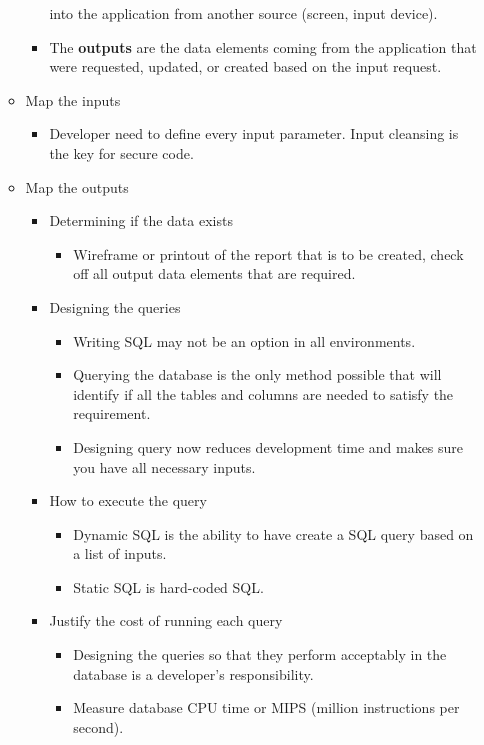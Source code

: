\documentclass[12pt]{article}
\begin{document}
\begin{itemize}
\begin{itemize}
\begin{itemize}
						into the application from another source (screen, input device).
					\item The \textbf{outputs} are the data elements coming from the
						application that were requested, updated, or created
						based on the input request.
				\end{itemize}
			\item Map the inputs
				\begin{itemize}
					\item Developer need to define every input parameter. Input
						cleansing is the key for secure code.
				\end{itemize}
			\item Map the outputs
				\begin{itemize}
					\item Determining if the data exists
						\begin{itemize}
							\item Wireframe or printout of the report that
								is to be created, check off all output
								data elements that are required.
						\end{itemize}
					\item Designing the queries
						\begin{itemize}
							\item Writing SQL may not be an option in all
								environments.
							\item Querying the database is the only method
								possible that will identify if all the
								tables and columns are needed to satisfy
								the requirement.
							\item Designing query now reduces development time and
								makes sure you have all necessary inputs.
						\end{itemize}
					\item How to execute the query
						\begin{itemize}
							\item Dynamic SQL is the ability to have create a
								SQL query based on a list of inputs.
							\item Static SQL is hard-coded SQL.
						\end{itemize}
					\item Justify the cost of running each query
						\begin{itemize}
							\item Designing the queries so that they perform
								acceptably in the database is a developer's
								responsibility.
							\item Measure database CPU time or MIPS (million
								instructions per second).
						\end{itemize}
				\end{itemize}
		\end{itemize}
\end{itemize}
\end{document}
